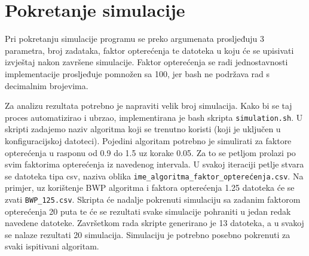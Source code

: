 \documentclass[../zavrsni.tex]{subfiles}
\begin{document}
\section{Pokretanje simulacije}

Pri pokretanju simulacije programu se preko argumenata prosljeđuju 3 parametra, broj zadataka, 
faktor opterećenja te datoteka u koju će se upisivati izvještaj nakon završene simulacije.
Faktor opterećenja se radi jednostavnosti implementacije prosljeđuje pomnožen sa 100, jer bash ne podržava rad s decimalnim brojevima.

Za analizu rezultata potrebno je napraviti velik broj simulacija. Kako bi se taj proces automatizirao i ubrzao, implementirana 
je bash skripta \texttt{simulation.sh}. U skripti zadajemo naziv algoritma koji se trenutno koristi (koji je uključen u 
konfiguracijskoj datoteci). Pojedini algoritam potrebno je simulirati za faktore opterećenja u rasponu od 0.9 do 1.5 uz korake 0.05.
Za to se petljom prolazi po svim faktorima opterećenja iz navedenog intervala. U svakoj iteraciji petlje stvara se datoteka tipa
csv, naziva oblika \texttt{{ime\_algoritma}\_{faktor\_opterećenja}.csv}. Na primjer, uz korištenje BWP algoritma i faktora opterećenja 1.25 
datoteka će se zvati \texttt{BWP\_125.csv}. Skripta će nadalje pokrenuti simulaciju sa zadanim faktorom opterećenja 20 puta te će se rezultati 
svake simulacije pohraniti u jedan redak navedene datoteke. Završetkom rada skripte generirano je 13 datoteka, a u svakoj se nalaze rezultati 
20 simulacija. Simulaciju je potrebno posebno pokrenuti za svaki ispitivani algoritam.  
\end{document}
